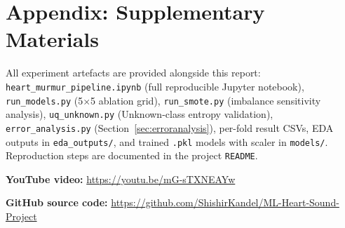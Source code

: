 \documentclass[10pt,twocolumn]{article}
\begin{document}
\section*{Appendix: Supplementary Materials}

All experiment artefacts are provided alongside this report: \nolinkurl{heart_murmur_pipeline.ipynb} (full reproducible Jupyter notebook), \nolinkurl{run_models.py} (5$\times$5 ablation grid), \nolinkurl{run_smote.py} (imbalance sensitivity analysis), \nolinkurl{uq_unknown.py} (Unknown-class entropy validation), \nolinkurl{error_analysis.py} (Section~\ref{sec:erroranalysis}), per-fold result CSVs, EDA outputs in \nolinkurl{eda_outputs/}, and trained \nolinkurl{.pkl} models with scaler in \nolinkurl{models/}. Reproduction steps are documented in the project \nolinkurl{README}.

\textbf{YouTube video:} \url{https://youtu.be/mG-sTXNEAYw}

\textbf{GitHub source code:} \url{https://github.com/ShishirKandel/ML-Heart-Sound-Project}




\end{document}
